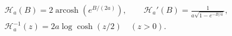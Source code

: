 \[
 \begin{gathered}
 \mathscr H_a(B)=2\operatorname{arcosh}(e^{B/(2a)}),\qquad
 \mathscr H_a'(B)=
 \frac{1}{a\sqrt{1-e^{-B/a}}},\\
 \mathscr H_a^{-1}(z)=2a\log\cosh(z/2)\quad(z>0).
 \end{gathered}
 \tag{RMT16}
\]